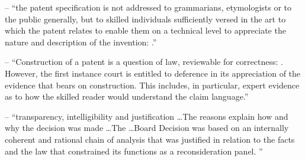 \p -- \enquote{the patent specification is not addressed to grammarians, etymologists or to the public generally, but to skilled individuals sufficiently versed in the art to which the patent relates to enable them on a technical level to appreciate the nature and description of the invention:  .}

\p -- \enquote{Construction of a patent is a question of law, reviewable for correctness: . However, the first instance court is entitled to deference in its appreciation of the evidence that bears on construction. This includes, in particular, expert evidence as to how the skilled reader would understand the claim language.}

\p -- \enquote{transparency, intelligibility and justification \ldots The reasons explain how and why the decision was made  \ldots The  \ldots Board Decision was based on an internally coherent and rational chain of analysis that was justified in relation to the facts and the law that constrained its functions as a reconsideration panel. }


\newpage
{}

